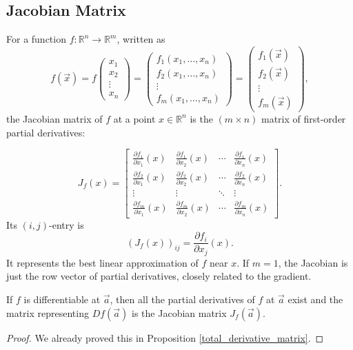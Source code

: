 \subsection{Jacobian Matrix}
\begin{definition}
For a function $f:\mathbb{R}^n \to \mathbb{R}^m$, written as
\[
f(\vec x)=f\begin{pmatrix}
x_1\\
x_2\\
\vdots\\
x_n
\end{pmatrix}=\begin{pmatrix}
f_1(x_1,\dots,x_n)\\
f_2(x_1,\dots,x_n)\\
\vdots\\
f_m(x_1,\dots,x_n)
\end{pmatrix}=\begin{pmatrix}
f_1(\vec x)\\
f_2(\vec x)\\
\vdots\\
f_m(\vec x)
\end{pmatrix},
\]
the Jacobian matrix of $f$ at a point $x \in \mathbb{R}^n$ is the $(m \times n)$ matrix of first-order partial derivatives:

\[
J_f(x) = \begin{bmatrix}
\frac{\partial f_1}{\partial x_1}(x) & \frac{\partial f_1}{\partial x_2}(x) & \cdots & \frac{\partial f_1}{\partial x_n}(x) \\
\frac{\partial f_2}{\partial x_1}(x) & \frac{\partial f_2}{\partial x_2}(x) & \cdots & \frac{\partial f_2}{\partial x_n}(x) \\
\vdots & \vdots & \ddots & \vdots \\
\frac{\partial f_m}{\partial x_1}(x) & \frac{\partial f_m}{\partial x_2}(x) & \cdots & \frac{\partial f_m}{\partial x_n}(x)
\end{bmatrix}.
\]
Its $(i,j)$-entry is
\[
(J_f(x))_{ij}=\frac{\partial f_i}{\partial x_j}(x).
\]
It represents the best linear approximation of $f$ near $x$. If $m=1$, the Jacobian is just the row vector of partial derivatives, closely related to the gradient.
\end{definition}
\begin{theorem}
  If $f$ is differentiable at $\vec a$, then all the partial derivatives of $f$ at $\vec a$ exist and the matrix representing $Df(\vec a)$ is the Jacobian matrix $J_f(\vec a)$.
\end{theorem}
\begin{proof}
  We already proved this in Proposition \ref{total_derivative_matrix}.
\end{proof}
